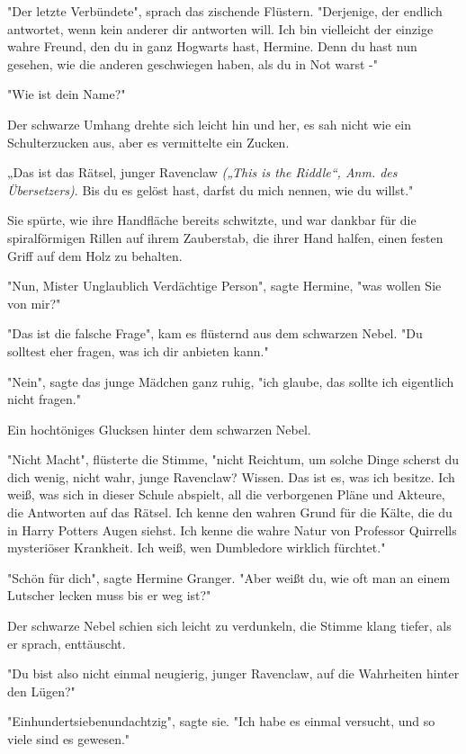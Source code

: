 {"Der letzte Verbündete", sprach das zischende Flüstern. "Derjenige, der endlich antwortet, wenn kein anderer dir antworten will. Ich bin vielleicht der einzige wahre Freund, den du in ganz Hogwarts hast, Hermine. Denn du hast nun gesehen, wie die anderen geschwiegen haben, als du in Not warst -"

"Wie ist dein Name?"

Der schwarze Umhang drehte sich leicht hin und her, es sah nicht wie ein Schulterzucken aus, aber es vermittelte ein Zucken.

„Das ist das Rätsel, junger Ravenclaw \emph{(„This is the Riddle“, Anm. des Übersetzers)}. Bis du es gelöst hast, darfst du mich nennen, wie du willst."

Sie spürte, wie ihre Handfläche bereits schwitzte, und war dankbar für die spiralförmigen Rillen auf ihrem Zauberstab, die ihrer Hand halfen, einen festen Griff auf dem Holz zu behalten.

"Nun, Mister Unglaublich Verdächtige Person", sagte Hermine, "was wollen Sie von mir?"

"Das ist die falsche Frage", kam es flüsternd aus dem schwarzen Nebel. "Du solltest eher fragen, was ich dir anbieten kann."

"Nein", sagte das junge Mädchen ganz ruhig, "ich glaube, das sollte ich eigentlich nicht fragen."

Ein hochtöniges Glucksen hinter dem schwarzen Nebel.

"Nicht Macht", flüsterte die Stimme, "nicht Reichtum, um solche Dinge scherst du dich wenig, nicht wahr, junge Ravenclaw? Wissen. Das ist es, was ich besitze. Ich weiß, was sich in dieser Schule abspielt, all die verborgenen Pläne und Akteure, die Antworten auf das Rätsel. Ich kenne den wahren Grund für die Kälte, die du in Harry Potters Augen siehst. Ich kenne die wahre Natur von Professor Quirrells mysteriöser Krankheit. Ich weiß, wen Dumbledore wirklich fürchtet."

"Schön für dich", sagte Hermine Granger. "Aber weißt du, wie oft man an einem Lutscher lecken muss bis er weg ist?"

Der schwarze Nebel schien sich leicht zu verdunkeln, die Stimme klang tiefer, als er sprach, enttäuscht.

"Du bist also nicht einmal neugierig, junger Ravenclaw, auf die Wahrheiten hinter den Lügen?"

"Einhundertsiebenundachtzig", sagte sie. "Ich habe es einmal versucht, und so viele sind es gewesen."

}
